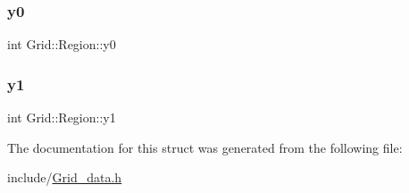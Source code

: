 \mbox{\label{struct_grid_1_1_region_aeb7fb84966ca292644218912da95dd96}} 
\subsubsection{\texorpdfstring{y0}{y0}}
{\footnotesize\ttfamily int Grid\+::\+Region\+::y0}

\mbox{\label{struct_grid_1_1_region_ab2e35ce7ae8e349ae041c889a05257d7}} 
\subsubsection{\texorpdfstring{y1}{y1}}
{\footnotesize\ttfamily int Grid\+::\+Region\+::y1}



The documentation for this struct was generated from the following file\+:\begin{DoxyCompactItemize}
\item 
include/\mbox{\hyperlink{_grid__data_8h}{Grid\+\_\+data.\+h}}\end{DoxyCompactItemize}
